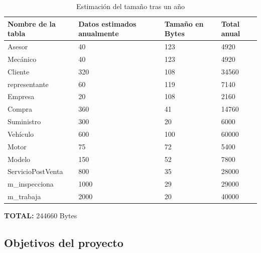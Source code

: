 \documentclass[12pt]{article}
\begin{document}
\begin{table}[h]
    \centering
    \begin{tabular}{|l|l|l|l|}
    \hline
    \textbf{Nombre de la tabla} & \textbf{Datos estimados anualmente} & \textbf{Tamaño en Bytes} & \textbf{Total anual} \\ \hline
    Asesor                      & 40         & 123 & 4920                                   \\ \hline
    Mecánico                    & 40         & 123 & 4920                                   \\ \hline
    Cliente                     & 320        & 108 & 34560                                  \\ \hline
    representante                   & 60         & 119 & 7140                                   \\ \hline
    Empresa                     & 20         & 108 & 2160                                   \\ \hline
    Compra                      & 360        & 41 & 14760                                 \\ \hline
    Suministro                  & 300        & 20 & 6000                                   \\ \hline
    Vehículo                    & 600        & 100 & 60000                                   \\ \hline
    Motor                       & 75         & 72 & 5400                                    \\ \hline
    Modelo                      & 150        & 52 & 7800                                    \\ \hline
    ServicioPostVenta           & 800        & 35  & 28000                                  \\ \hline
    m\_inspecciona              & 1000       & 29  & 29000                                  \\ \hline
    m\_trabaja                  & 2000       & 20 & 40000                                   \\ \hline
    \end{tabular}
    \caption{Estimación del tamaño tras un año}
\end{table}

\textbf{TOTAL:} 244660 Bytes

\newpage

\subsection{Objetivos del proyecto}
\end{document}
